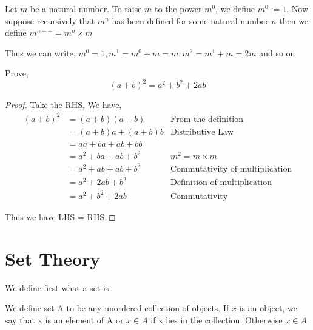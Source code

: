 \documentclass[11pt]{report}
\begin{document}
\begin{definition}
	Let $m$ be a natural number. To raise $m$ to the power $m^0$, we define $m^0 := 1$. Now suppose recursively that $m^n $ has been defined for some natural number $n$ then we define $m^{n++} = m^n \times m$
\end{definition}
Thus we can write, $m^0 = 1, m^1 = m^0+m = m, m^2 = m^1 + m = 2m$ and so on
\begin{prop}
	Prove,
	\[
		(a + b)^2 = a^2 + b^2 + 2ab
	\]
\end{prop}
\begin{proof}
	Take the RHS,
	We have,
	\begin{align*}
		(a+b)^2 & = (a+b)(a+b)          & \text{From the definition}             \\
		        & = (a+b)a + (a+b)b     & \text{Distributive Law}                \\
		        & = aa + ba + ab + bb   &                                        \\
		        & = a^2 + ba + ab + b^2 & \text{$m^2 = m \times m$}              \\
		        & = a^2 + ab + ab + b^2 & \text{Commutativity of multiplication} \\
		        & = a^2 + 2ab + b^2     & \text{Definition of multiplication}    \\
		        & = a^2 +  b^2 + 2ab    & \text{Commutativity}
	\end{align*}

	Thus we have LHS = RHS
\end{proof}


\chapter{Set Theory}

We define first what a set is:

\begin{definition}[Sets]
	We define set A to be any unordered collection of objects. If $x$ is an object, we say that x is an element of A or $x \in A$ if x lies in the collection. Otherwise $x \in A$
\end{definition}
\end{document}

